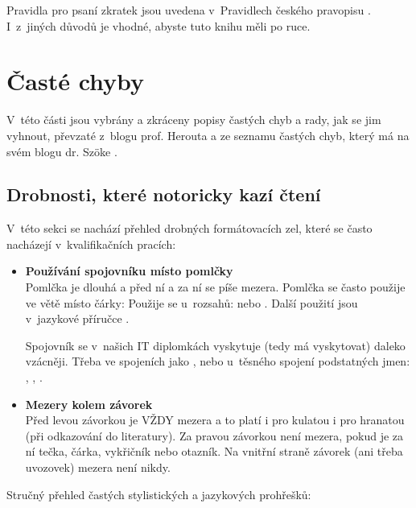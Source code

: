 Pravidla pro psaní zkratek jsou uvedena v~Pravidlech českého pravopisu \cite{Pravidla}. I~z~jiných důvodů je vhodné, abyste tuto knihu měli po ruce. 


\section{Časté chyby}
\label{chyby}

V~této části jsou vybrány a zkráceny popisy častých chyb a rady, jak se jim vyhnout, převzaté z~blogu prof. Herouta \cite{Herout} a ze seznamu častých chyb, který má na svém blogu dr. Szöke \cite{chyby}.

\subsection*{Drobnosti, které notoricky kazí čtení}
V~této sekci se nachází přehled drobných formátovacích zel, které se často nacházejí v~kvalifikačních pracích:

\begin{itemize}
	\item{
    	\textbf{Používání spojovníku místo pomlčky} \\
    	Pomlčka je dlouhá a před ní a za ní se píše mezera. Pomlčka se často použije ve větě místo čárky:  Použije se u~rozsahů:  nebo . Další použití jsou v~jazykové příručce \cite{prirucka}.

Spojovník se v~našich IT diplomkách vyskytuje (tedy má vyskytovat) daleko vzácněji. Třeba ve spojeních jako , nebo u~těsného spojení podstatných jmen: , , .
    } 
    \item{
    	\textbf{Mezery kolem závorek} \\
        Před levou závorkou je VŽDY mezera a to platí i pro kulatou i pro hranatou (při odkazování do literatury). Za pravou závorkou není mezera, pokud je za ní tečka, čárka, vykřičník nebo otazník. Na vnitřní straně závorek (ani třeba uvozovek) mezera není nikdy. 
    }
\end{itemize}

\noindent Stručný přehled častých stylistických a jazykových prohřešků:

